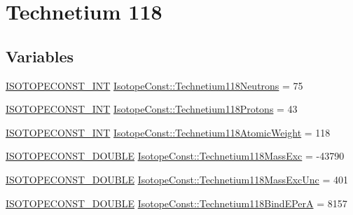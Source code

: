 \hypertarget{group___isotope_const-_technetium-_tc118}{}\section{Technetium 118}
\label{group___isotope_const-_technetium-_tc118}
\subsection*{Variables}
\begin{DoxyCompactItemize}
\item 
\mbox{\hyperlink{group___isotope_const-_macros_ga5f18360b3e99483a35c32d789e62621c}{I\+S\+O\+T\+O\+P\+E\+C\+O\+N\+S\+T\+\_\+\+I\+NT}} \mbox{\hyperlink{group___isotope_const-_technetium-_tc118_ga5a0b7763c74335ce7ab417349bcde0a8}{Isotope\+Const\+::\+Technetium118\+Neutrons}} = 75
\item 
\mbox{\hyperlink{group___isotope_const-_macros_ga5f18360b3e99483a35c32d789e62621c}{I\+S\+O\+T\+O\+P\+E\+C\+O\+N\+S\+T\+\_\+\+I\+NT}} \mbox{\hyperlink{group___isotope_const-_technetium-_tc118_gaef1c89cb1ef152617ec388a5aa3f85f1}{Isotope\+Const\+::\+Technetium118\+Protons}} = 43
\item 
\mbox{\hyperlink{group___isotope_const-_macros_ga5f18360b3e99483a35c32d789e62621c}{I\+S\+O\+T\+O\+P\+E\+C\+O\+N\+S\+T\+\_\+\+I\+NT}} \mbox{\hyperlink{group___isotope_const-_technetium-_tc118_ga5d84f42db122c7efc8bf395c7ab3078d}{Isotope\+Const\+::\+Technetium118\+Atomic\+Weight}} = 118
\item 
\mbox{\hyperlink{group___isotope_const-_macros_ga8f45a7272ce02c0b4c65c44636ed719a}{I\+S\+O\+T\+O\+P\+E\+C\+O\+N\+S\+T\+\_\+\+D\+O\+U\+B\+LE}} \mbox{\hyperlink{group___isotope_const-_technetium-_tc118_ga0d41f782e8a1d3b8fd9c2e5ec7beba72}{Isotope\+Const\+::\+Technetium118\+Mass\+Exc}} = -\/43790
\item 
\mbox{\hyperlink{group___isotope_const-_macros_ga8f45a7272ce02c0b4c65c44636ed719a}{I\+S\+O\+T\+O\+P\+E\+C\+O\+N\+S\+T\+\_\+\+D\+O\+U\+B\+LE}} \mbox{\hyperlink{group___isotope_const-_technetium-_tc118_ga81690209e8073e08bc13aac631ed6940}{Isotope\+Const\+::\+Technetium118\+Mass\+Exc\+Unc}} = 401
\item 
\mbox{\hyperlink{group___isotope_const-_macros_ga8f45a7272ce02c0b4c65c44636ed719a}{I\+S\+O\+T\+O\+P\+E\+C\+O\+N\+S\+T\+\_\+\+D\+O\+U\+B\+LE}} \mbox{\hyperlink{group___isotope_const-_technetium-_tc118_ga1df6310a7d9c0cc58110d19ef54b23f3}{Isotope\+Const\+::\+Technetium118\+Bind\+E\+PerA}} = 8157
\item 

\end{DoxyCompactItemize}
